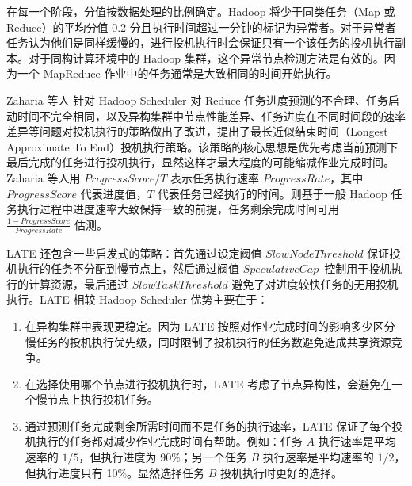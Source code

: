 在每一个阶段，分值按数据处理的比例确定。Hadoop 将少于同类任务（Map 或 Reduce）的平均分值 0.2 分且执行时间超过一分钟的标记为异常者。对于异常者任务认为他们是同样缓慢的，进行投机执行时会保证只有一个该任务的投机执行副本。对于同构计算环境中的 Hadoop 集群，这个异常节点检测方法是有效的。因为一个 MapReduce 作业中的任务通常是大致相同的时间开始执行。
                                                                                                                                                                                                                                                                                                                                                                                       
Zaharia 等人 \cite{Zaharia:2008:IMP:1855741.1855744} 针对 Hadoop Scheduler 对 Reduce 任务进度预测的不合理、任务启动时间不完全相同，以及异构集群中节点性能差异、任务进度在不同时间段的速率差异等问题对投机执行的策略做出了改进，提出了最长近似结束时间（Longest Approximate To End）投机执行策略。该策略的核心思想是优先考虑当前预测下最后完成的任务进行投机执行，显然这样才最大程度的可能缩减作业完成时间。Zaharia 等人用 $ProgressScore / T$ 表示任务执行速率 $ProgressRate$，其中 $ProgressScore$ 代表进度值，$T$ 代表任务已经执行的时间。则基于一般 Hadoop 任务执行过程中进度速率大致保持一致的前提，任务剩余完成时间可用 $\frac{1 - ProgressScore}{ProgressRate}$ 估测。

LATE \cite{Zaharia:2008:IMP:1855741.1855744} 还包含一些启发式的策略：首先通过设定阀值 $SlowNodeThreshold$ 保证投机执行的任务不分配到慢节点上，然后通过阀值 $SpeculativeCap$ 控制用于投机执行的计算资源，最后通过 $SlowTaskThreshold$ 避免了对进度较快任务的无用投机执行。LATE 相较 Hadoop Scheduler 优势主要在于：
\begin{enumerate}
\item 在异构集群中表现更稳定。因为 LATE 按照对作业完成时间的影响多少区分慢任务的投机执行优先级，同时限制了投机执行的任务数避免造成共享资源竞争。
\item 在选择使用哪个节点进行投机执行时，LATE 考虑了节点异构性，会避免在一个慢节点上执行投机任务。
\item 通过预测任务完成剩余所需时间而不是任务的执行速率，LATE 保证了每个投机执行的任务都对减少作业完成时间有帮助。例如：任务 $A$ 执行速率是平均速率的 $1/5$，但执行进度为 90\%；另一个任务 $B$ 执行速率是平均速率的 $1/2$，但执行进度只有 10\%。显然选择任务 $B$ 投机执行时更好的选择。
\end{enumerate}

